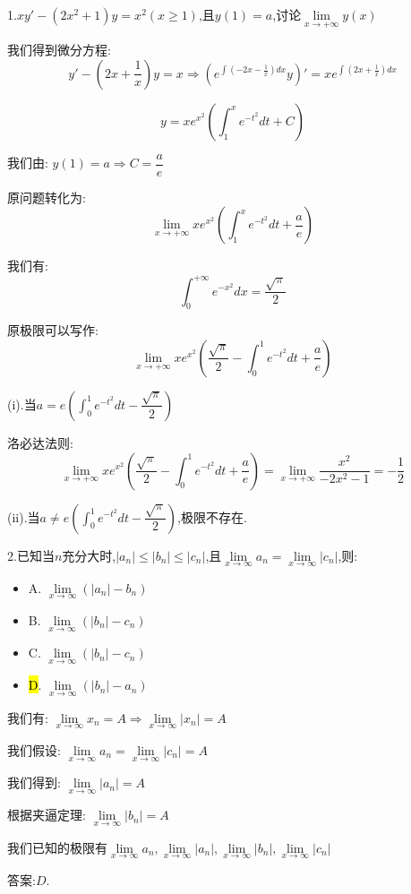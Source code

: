 1.$xy'-(2x^2+1)y=x^2(x\geq 1)$,且$y(1)=a$,讨论$\lim\limits_{x\rightarrow +\infty}y(x)$
\begin{solution}
	
	我们得到微分方程: 
	$$y'-(2x+\frac{1}{x})y=x\Rightarrow (e^{\int (-2x-\frac{1}{x})dx}y)'=xe^{\int (2x+\frac{1}{x})dx}$$
	
	$$y=xe^{x^2}(\int_{1}^{x}e^{-t^2}dt+C)$$
	
	我们由: $y(1)=a\Rightarrow C=\dfrac{a}{e}$
	
	原问题转化为: 
	$$\lim\limits_{x\rightarrow +\infty}xe^{x^2}(\int_{1}^{x}e^{-t^2}dt+\frac{a}{e})$$
	
	我们有: $$\int_{0}^{+\infty}e^{-x^2}dx=\frac{\sqrt{\pi}}{2}$$
	
	原极限可以写作: 
	$$\lim\limits_{x\rightarrow +\infty}xe^{x^2}(\frac{\sqrt{\pi}}{2}-\int_{0}^{1}e^{-t^2}dt+\frac{a}{e})$$
	
	(i).当$a=e(\int_{0}^{1}e^{-t^2}dt-\dfrac{\sqrt{\pi}}{2})$
	
	洛必达法则: $$\lim\limits_{x\rightarrow +\infty}xe^{x^2}(\frac{\sqrt{\pi}}{2}-\int_{0}^{1}e^{-t^2}dt+\frac{a}{e})=\lim\limits_{x\rightarrow +\infty}\frac{x^2}{-2x^2-1}=-\frac{1}{2}$$
	
	(ii).当$a\neq e(\int_{0}^{1}e^{-t^2}dt-\dfrac{\sqrt{\pi}}{2})$,极限不存在.
\end{solution}


2.已知当$n$充分大时,$|a_{n}|\leq |b_{n}|\leq |c_{n}|$,且$\lim\limits_{x\rightarrow \infty}a_{n}=\lim\limits_{x\rightarrow \infty}|c_{n}|$,则: 
\begin{itemize}
	\item A. $\lim\limits_{x\rightarrow \infty}(|a_{n}|-b_{n})$
	\item B. $\lim\limits_{x\rightarrow \infty}(|b_{n}|-c_{n})$
	\item C. $\lim\limits_{x\rightarrow \infty}(|b_{n}|-c_{n})$
	\item \hl{D}. $\lim\limits_{x\rightarrow \infty}(|b_{n}|-a_{n})$
\end{itemize}
\begin{solution}
	
	我们有: $\lim\limits_{x\rightarrow \infty}x_{n}=A\Rightarrow \lim\limits_{x\rightarrow \infty}|x_{n}|=A$
	
	我们假设: $\lim\limits_{x\rightarrow \infty}a_{n}=\lim\limits_{x\rightarrow \infty}|c_{n}|=A$
	
	我们得到: $\lim\limits_{x\rightarrow \infty}|a_{n}|=A$
	
	根据夹逼定理: $\lim\limits_{x\rightarrow \infty}|b_{n}|=A$
	
	我们已知的极限有$\lim\limits_{x\rightarrow \infty}a_{n},\lim\limits_{x\rightarrow \infty}|a_{n}|,\lim\limits_{x\rightarrow \infty}|b_{n}|,\lim\limits_{x\rightarrow \infty}|c_{n}|$
	
	答案:$D$.
\end{solution}

